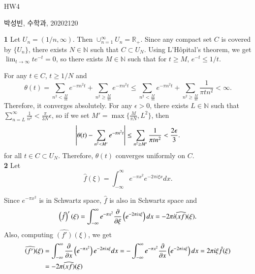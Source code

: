\documentclass[a4paper, 12pt]{article}
\theoremstyle{Mydefinition}
\theoremstyle{Mytheorem}
\begin{document}
\thispagestyle{myfirstpage}
\begin{center}
	\Large{HW4}
\end{center}
박성빈, 수학과, 20202120

\noindent \textbf{1}
Let $U_n = (1/n, \infty)$. Then $\cup_{n=1}^\infty U_n = \mathbb{R}_+$. Since any compact set $C$ is covered by $\{U_n\}$, there exists $N\in\mathbb{N}$ such that $C\subset U_N$. Using L'H\^opital's theorem, we get $\lim_{t\rightarrow \infty} te^{-t} = 0$, so there exists $M\in\mathbb{N}$ such that for $t\geq M$, $e^{-t}\leq 1/t$.

For any $t\in C$, $t\geq 1/N$ and
\begin{equation}
    \theta(t) = \sum_{n^2<\frac{M}{\pi t}} e^{-\pi n^2 t} + \sum_{n^2\geq \frac{M}{\pi t}} e^{-\pi n^2 t}\leq \sum_{n^2<\frac{M}{\pi t}} e^{-\pi n^2 t} + \sum_{n^2\geq \frac{M}{\pi t}} \frac{1}{\pi tn^2}<\infty.
\end{equation}
Therefore, it converges absolutely. For any $\epsilon>0$, there exists $L\in\mathbb{N}$ such that $\sum_{n=L}^\infty \frac{1}{n^2}<\frac{\pi}{3N}\epsilon$, so if we set $M' = \max\{\frac{M}{\pi N}, L^2\}$, then
\begin{equation}
    \abs{\theta(t)-\sum_{n^2<M'} e^{-\pi n^2 t}}\leq \sum_{n^2\geq M'} \frac{1}{\pi tn^2}<\frac{2\epsilon}{3}.
\end{equation}
for all $t\in C\subset U_N$. Therefore, $\theta(t)$ converges uniformly on $C$.\\

\noindent \textbf{2}
Let
\begin{equation}
    \hat{f}(\xi) = \int_{-\infty}^\infty e^{-\pi x^2} e^{-2\pi i \xi x }dx.
\end{equation}

Since $e^{-\pi x^2}$ is in Schwartz space, $\hat{f}$ is also in Schwartz space and
\begin{equation}
    \left(\hat{f}\right)'(\xi) =  \int_{-\infty}^\infty e^{-\pi x^2} \pdv{\xi}\left(e^{-2\pi i x \xi}\right)dx = -2\pi i \widehat{\left(xf\right)}(\xi).
\end{equation}
Also, computing $\widehat{\left(f'\right)}(\xi)$, we get
\begin{equation}
\begin{split}
    \widehat{\left(f'\right)}(\xi) &= \int_{-\infty}^\infty \pdv{x}\left(e^{-\pi x^2}\right)e^{-2\pi i x \xi} dx = -\int_{-\infty}^\infty e^{-\pi x^2}\pdv{x}\left(e^{-2\pi i x \xi}\right) dx = 2\pi i \xi\hat{f}(\xi)\\
    &=-2\pi\widehat{\left(xf\right)}(\xi)
\end{split}
\end{equation}
\end{document}
